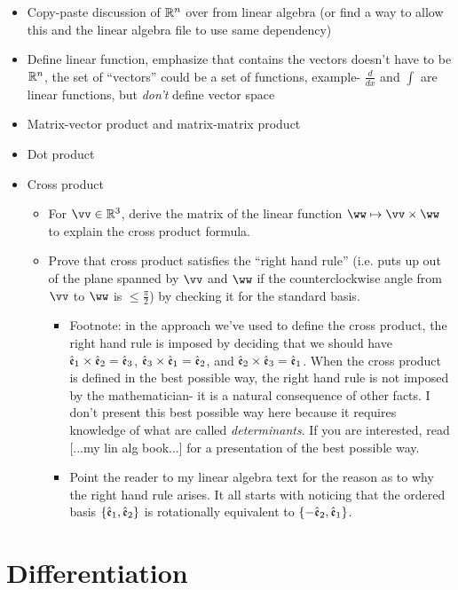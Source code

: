 \begin{itemize}
    \item Copy-paste discussion of $\mathbb{R}^n$ over from linear algebra (or find a way to allow this and the linear algebra file to use same dependency)
    \item Define linear function, emphasize that contains the vectors doesn't have to be $\mathbb{R}^n$, the set of ``vectors'' could be a set of functions, example- $\frac{d}{dx}$ and $\int$ are linear functions, but \textit{don't} define vector space
    \item Matrix-vector product and matrix-matrix product
    \item Dot product
    \item Cross product
    \begin{itemize}
        \item For $\vv \in \R^3$, derive the matrix of the linear function $\ww \mapsto \vv \times \ww$ to explain the cross product formula.
        \item Prove that cross product satisfies the ``right hand rule'' (i.e. puts up out of the plane spanned by $\vv$ and $\ww$ if the counterclockwise angle from $\vv$ to $\ww$ is $\leq \frac{\pi}{2}$) by checking it for the standard basis.
        \begin{itemize}
            \item Footnote: in the approach we've used to define the cross product, the right hand rule is imposed by deciding that we should have $\hat{\mathfrak{e}}_1 \times \hat{\mathfrak{e}}_2 = \hat{\mathfrak{e}}_3$, $\hat{\mathfrak{e}}_3 \times \hat{\mathfrak{e}}_1 = \hat{\mathfrak{e}}_2$, and $\hat{\mathfrak{e}}_2 \times \hat{\mathfrak{e}}_3 = \hat{\mathfrak{e}}_1$. When the cross product is defined in the best possible way, the right hand rule is not imposed by the mathematician- it is a natural consequence of other facts. I don't present this best possible way here because it requires knowledge of what are called \textit{determinants}. If you are interested, read [...my lin alg book...] for a presentation of the best possible way.
            \item Point the reader to my linear algebra text for the reason as to why the right hand rule arises. It all starts with noticing that the ordered basis $\{\hat{\mathfrak{e}}_1, \hat{\mathfrak{e}}_2\}$ is rotationally equivalent to $\{-\hat{\mathfrak{e}}_2, \hat{\mathfrak{e}}_1\}$.
        \end{itemize}
    \end{itemize}
\end{itemize}

\newpage

\section*{Differentiation}

